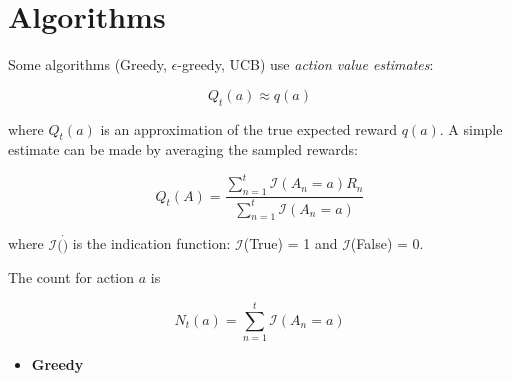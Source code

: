 \documentclass{article}
\begin{document}
\section{Algorithms}
Some algorithms (Greedy, $\epsilon$-greedy, UCB) use \emph{action value estimates}:

\[Q_t(a) \approx q(a)\]


where $Q_t(a)$ is an approximation of the true expected reward $q(a)$. A simple estimate can be made by averaging the sampled rewards:


\[Q_t(A) = \frac{\sum_{n=1}^t\mathcal{I}(A_n=a)R_n}{\sum_{n=1}^t\mathcal{I}(A_n=a)}\]

where $\mathcal{I}(\dot)$ is the indication function: $\mathcal{I}$(True) = 1 and $\mathcal{I}$(False) = 0.


The count for action $a$ is

\[N_t(a) = \sum_{n=1}^t\mathcal{I}(A_n = a)\]

\begin{itemize}
\item
\textbf{Greedy} 
\end{itemize}
\end{document}
